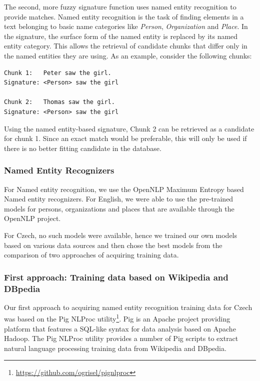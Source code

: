 The second, more fuzzy signature function uses named entity recognition
to provide matches. Named entity recognition is the task of finding
elements in a text belonging to basic name categories like
\emph{Person}, \emph{Organization} and \emph{Place}. In the signature,
the surface form of the named entity is replaced by its named entity
category. This allows the retrieval of candidate chunks that differ only
in the named entities they are using. As an example, consider the
following chunks:

\begin{lstlisting}
Chunk 1:   Peter saw the girl.
Signature: <Person> saw the girl

Chunk 2:   Thomas saw the girl.
Signature: <Person> saw the girl
\end{lstlisting}

Using the named entity-based signature, Chunk 2 can be retrieved as a
candidate for chunk 1. Since an exact match would be preferable, this 
will only be used if there is no better fitting candidate in the
database.

\subsubsection{Named Entity Recognizers}

For Named entity recognition, we use the OpenNLP Maximum Entropy based
Named entity recognizers. For English, we were able to use the pre-trained
models for persons, organizations and places that are available through the
OpenNLP project.

For Czech, no such models were available, hence we trained our own models based
on various data sources and then chose the best models from the comparison 
of two approaches of acquiring training data.


\subsubsection*{First approach: Training data based on Wikipedia and DBpedia}

Our first approach to acquiring named entity recognition training data for Czech 
was based on the Pig NLProc utility\footnote{\url{https://github.com/ogrisel/pignlproc}}.
Pig is an Apache project providing platform that features a SQL-like syntax
for data analysis based on Apache Hadoop. The Pig NLProc utility provides a number
of Pig scripts to extract natural language processing training data from Wikipedia
and DBpedia.

